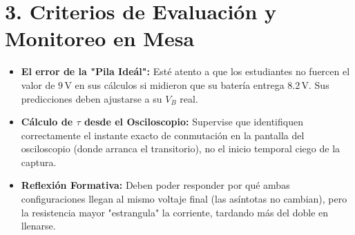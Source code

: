 \documentclass[11pt, a4paper]{article}
\begin{document}
\section*{3. Criterios de Evaluación y Monitoreo en Mesa}
\begin{itemize}
    \item \textbf{El error de la "Pila Ideál":} Esté atento a que los estudiantes no fuercen el valor de $9\,\text{V}$ en sus cálculos si midieron que su batería entrega $8.2\,\text{V}$. Sus predicciones deben ajustarse a su $V_B$ real.
    \item \textbf{Cálculo de $\tau$ desde el Osciloscopio:} Supervise que identifiquen correctamente el instante exacto de conmutación en la pantalla del osciloscopio (donde arranca el transitorio), no el inicio temporal ciego de la captura.
    \item \textbf{Reflexión Formativa:} Deben poder responder por qué ambas configuraciones llegan al mismo voltaje final (las asíntotas no cambian), pero la resistencia mayor "estrangula" la corriente, tardando más del doble en llenarse.
\end{itemize}
\end{document}
